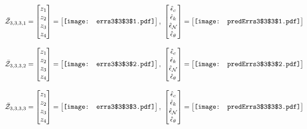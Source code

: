 \documentclass[12pt]{article}
\begin{document}
\begin{gather*}
\bar{\mathcal{Z}}_{3,3,3,1}=\begin{bmatrix}
z_1\\
z_2\\
z_3\\
z_4
 \end{bmatrix}= \begin{bmatrix}
\vcenter{\hbox{\texttt{[image: errs3\$3\$3\$1.pdf]}}}
 \end{bmatrix},\,\, \begin{bmatrix}
\hat{\epsilon}_c\\\hat{\epsilon}_k\\\hat{\epsilon}_\mathcal{N}\\\hat{\epsilon}_\theta
 \end{bmatrix}=\begin{bmatrix}
\vcenter{\hbox{\texttt{[image: predErrs3\$3\$3\$1.pdf]}}}
 \end{bmatrix}
\end{gather*}


\begin{gather*}
\bar{\mathcal{Z}}_{3,3,3,2}=\begin{bmatrix}
z_1\\
z_2\\
z_3\\
z_4
 \end{bmatrix}= \begin{bmatrix}
\vcenter{\hbox{\texttt{[image: errs3\$3\$3\$2.pdf]}}}
 \end{bmatrix},\,\, \begin{bmatrix}
\hat{\epsilon}_c\\\hat{\epsilon}_k\\\hat{\epsilon}_\mathcal{N}\\\hat{\epsilon}_\theta
 \end{bmatrix}=\begin{bmatrix}
\vcenter{\hbox{\texttt{[image: predErrs3\$3\$3\$2.pdf]}}}
 \end{bmatrix}
\end{gather*}


\begin{gather*}
\bar{\mathcal{Z}}_{3,3,3,3}=\begin{bmatrix}
z_1\\
z_2\\
z_3\\
z_4
 \end{bmatrix}= \begin{bmatrix}
\vcenter{\hbox{\texttt{[image: errs3\$3\$3\$3.pdf]}}}
 \end{bmatrix},\,\, \begin{bmatrix}
\hat{\epsilon}_c\\\hat{\epsilon}_k\\\hat{\epsilon}_\mathcal{N}\\\hat{\epsilon}_\theta
 \end{bmatrix}=\begin{bmatrix}
\vcenter{\hbox{\texttt{[image: predErrs3\$3\$3\$3.pdf]}}}
 \end{bmatrix}
\end{gather*}
\end{document}
